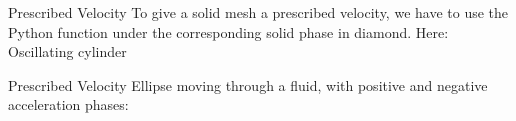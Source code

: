 \documentclass[	%
	bigger, %
	hyperref, %
	xcolor,	%
	t,		%
]{beamer}
\begin{document}
\begin{frame}{Prescribed Velocity}
 To give a solid mesh a prescribed velocity, we have to use the Python function under the corresponding solid phase in diamond. Here: Oscillating cylinder\\
\begin{center}
\end{center}
\end{frame}

\begin{frame}{Prescribed Velocity}
 Ellipse moving through a fluid, with positive and negative acceleration phases:
\begin{center}
\end{center}
\end{frame}
\end{document}
